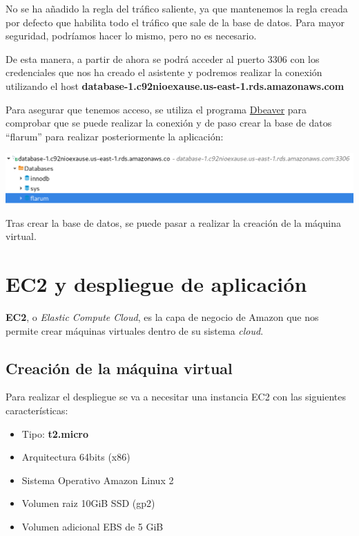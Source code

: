 \documentclass{\ClassPath/viu-tfm-template}
\begin{document}
No se ha añadido la regla del tráfico saliente, ya que mantenemos la regla creada por defecto que habilita todo el tráfico que sale de la base de datos. Para mayor seguridad, podríamos hacer lo mismo, pero no es necesario.


De esta manera, a partir de ahora se podrá acceder al puerto 3306 con los credenciales que nos ha creado el asistente y podremos realizar la conexión utilizando el host \textbf{database-1.c92nioexause.us-east-1.rds.amazonaws.com}

Para asegurar que tenemos acceso, se utiliza el programa \href{https://dbeaver.io/}{Dbeaver} para comprobar que se puede realizar la conexión y de paso crear la base de datos “flarum” para realizar posteriormente la aplicación:

\begin{center}
    \includegraphics[frame,width=\linewidth]{img/db6.png}
\end{center}

Tras crear la base de datos, se puede pasar a realizar la creación de la máquina virtual.




\chapter{EC2 y despliegue de aplicación}
\textbf{EC2}, o \textit{Elastic Compute Cloud}, es la capa de negocio de Amazon que nos permite crear máquinas virtuales dentro de su sistema \textit{cloud}.

\section{Creación de la máquina virtual}
Para realizar el despliegue se va a necesitar una instancia EC2 con las siguientes características:
\begin{itemize}
    \item Tipo: \textbf{t2.micro}
    \item Arquitectura 64bits (x86)
    \item Sistema Operativo Amazon Linux 2
    \item Volumen raiz 10GiB SSD (gp2)
    \item Volumen adicional EBS de 5 GiB
\end{itemize}
\end{document}
